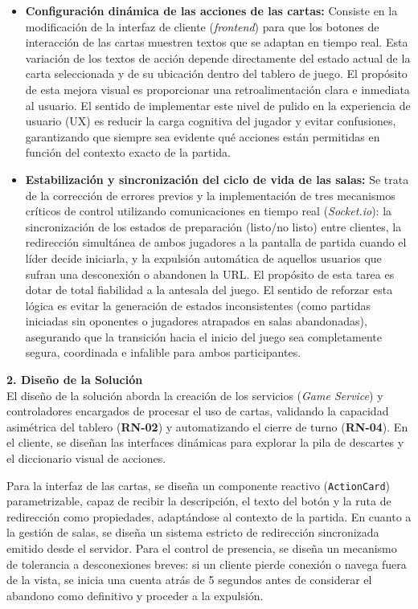 \begin{itemize}
    \item \textbf{Configuración dinámica de las acciones de las cartas:} Consiste en la modificación de la interfaz de cliente (\textit{frontend}) para que los botones de interacción de las cartas muestren textos que se adaptan en tiempo real. Esta variación de los textos de acción depende directamente del estado actual de la carta seleccionada y de su ubicación dentro del tablero de juego. El propósito de esta mejora visual es proporcionar una retroalimentación clara e inmediata al usuario. El sentido de implementar este nivel de pulido en la experiencia de usuario (UX) es reducir la carga cognitiva del jugador y evitar confusiones, garantizando que siempre sea evidente qué acciones están permitidas en función del contexto exacto de la partida.

    \item \textbf{Estabilización y sincronización del ciclo de vida de las salas:} Se trata de la corrección de errores previos y la implementación de tres mecanismos críticos de control utilizando comunicaciones en tiempo real (\textit{Socket.io}): la sincronización de los estados de preparación (listo/no listo) entre clientes, la redirección simultánea de ambos jugadores a la pantalla de partida cuando el líder decide iniciarla, y la expulsión automática de aquellos usuarios que sufran una desconexión o abandonen la URL. El propósito de esta tarea es dotar de total fiabilidad a la antesala del juego. El sentido de reforzar esta lógica es evitar la generación de estados inconsistentes (como partidas iniciadas sin oponentes o jugadores atrapados en salas abandonadas), asegurando que la transición hacia el inicio del juego sea completamente segura, coordinada e infalible para ambos participantes.
\end{itemize}


\textbf{2. Diseño de la Solución} \\
El diseño de la solución aborda la creación de los servicios (\textit{Game Service}) y controladores encargados de procesar el uso de cartas, validando la capacidad asimétrica del tablero (\textbf{RN-02}) y automatizando el cierre de turno (\textbf{RN-04}). En el cliente, se diseñan las interfaces dinámicas para explorar la pila de descartes y el diccionario visual de acciones.

Para la interfaz de las cartas, se diseña un componente reactivo (\texttt{ActionCard}) parametrizable, capaz de recibir la descripción, el texto del botón y la ruta de redirección como propiedades, adaptándose al contexto de la partida. En cuanto a la gestión de salas, se diseña un sistema estricto de redirección sincronizada emitido desde el servidor. Para el control de presencia, se diseña un mecanismo de tolerancia a desconexiones breves: si un cliente pierde conexión o navega fuera de la vista, se inicia una cuenta atrás de 5 segundos antes de considerar el abandono como definitivo y proceder a la expulsión.


